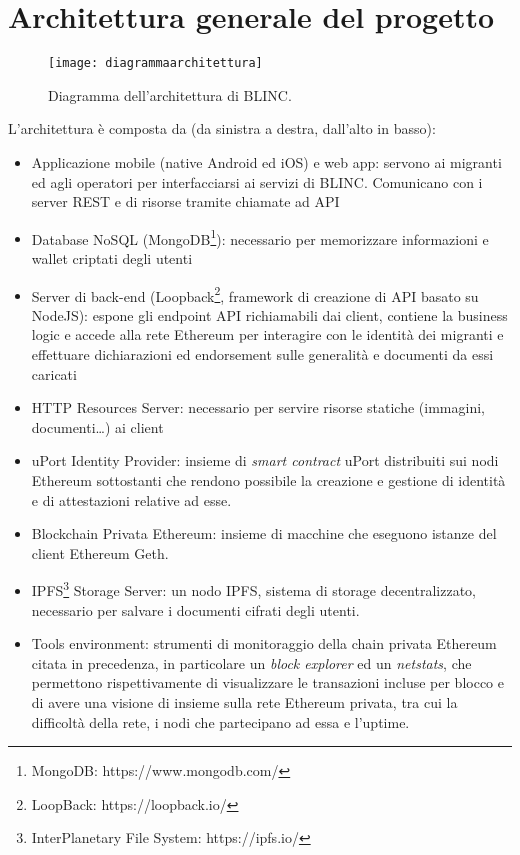 \section{Architettura generale del progetto}

\begin{figure}[!ht]
    \texttt{[image: diagrammaarchitettura]}
    \caption{Diagramma dell'architettura di BLINC.}
    \label{fig:diagrammaarchitettura}
\end{figure}

L’architettura è composta da (da sinistra a destra, dall’alto in basso):
\begin{itemize}
    \item Applicazione mobile (native Android ed iOS) e web app: servono ai migranti ed agli operatori
    per interfacciarsi ai servizi di BLINC.
    Comunicano con i server REST e di risorse tramite chiamate ad API
    \item Database NoSQL (MongoDB\footnote{MongoDB: https://www.mongodb.com/}): necessario per memorizzare informazioni e wallet
    criptati degli utenti
    \item Server di back-end (Loopback\footnote{LoopBack: https://loopback.io/}, framework di creazione di API basato su NodeJS): espone gli endpoint API richiamabili
    dai client, contiene la business logic e accede alla rete Ethereum per interagire
    con le identità dei migranti e effettuare dichiarazioni ed endorsement sulle generalità e documenti da essi caricati
    \item HTTP Resources Server: necessario per servire risorse statiche (immagini, documenti…) ai client
    \item uPort Identity Provider: insieme di \emph{smart contract} uPort distribuiti sui nodi Ethereum sottostanti che rendono
    possibile la creazione e gestione di identità e di attestazioni relative ad esse.
    \item Blockchain Privata Ethereum: insieme di macchine che eseguono istanze del client Ethereum Geth.
    \item IPFS\footnote{InterPlanetary File System: https://ipfs.io/} Storage Server: un nodo IPFS, sistema di storage decentralizzato, necessario per salvare i 
    documenti cifrati degli utenti.
    \item Tools environment: strumenti di monitoraggio della chain privata Ethereum citata in precedenza,
    in particolare un \emph{block explorer} ed un
    \emph{netstats}, che permettono rispettivamente di visualizzare le transazioni incluse per blocco
    e di avere una visione di insieme sulla rete Ethereum privata,
    tra cui la difficoltà della rete, i nodi che partecipano ad essa e l'uptime.
\end{itemize}

